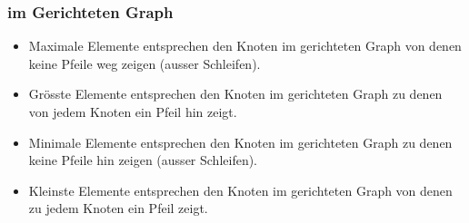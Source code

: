 \subsubsection{im Gerichteten Graph}
\begin{itemize}
    \item Maximale Elemente entsprechen den Knoten im gerichteten
    Graph von denen keine Pfeile weg zeigen (ausser Schleifen).
    \item Grösste Elemente entsprechen den Knoten im gerichteten
    Graph zu denen von jedem Knoten ein Pfeil hin zeigt.
    \item Minimale Elemente entsprechen den Knoten im gerichteten
    Graph zu denen keine Pfeile hin zeigen (ausser Schleifen).
    \item Kleinste Elemente entsprechen den Knoten im gerichteten
    Graph von denen zu jedem Knoten ein Pfeil zeigt.
\end{itemize}

